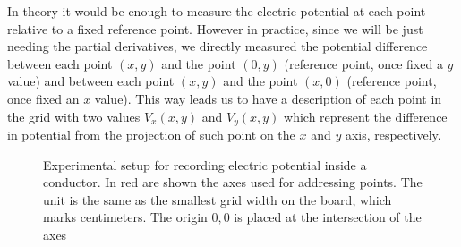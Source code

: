 \documentclass[notitlepage]{report}
\newcounter{theo}[section]\setcounter{theo}{0}
\numberwithin{equation}{section}
\theoremstyle{plain}
\theoremstyle{definition}
\theoremstyle{remark}
\begin{document}
In theory it would be enough to measure the electric potential at each point
relative to a fixed reference point. However in practice, since we will be just
needing the partial derivatives, we directly measured the potential difference
between each point \((x, y)\) and the point \((0, y)\) (reference point, once
fixed a \(y\) value) and between each point \((x, y)\) and the point \((x, 0)\)
(reference point, once fixed an \(x\) value). This way leads us to have a
description of each point in the grid with two values \(V_x(x, y)\) and \(V_y(x,
y)\) which represent the difference in potential from the projection of such
point on the \(x\) and \(y\) axis, respectively.

\begin{figure}[h!t]
    \caption{Experimental setup for recording electric potential inside a
    conductor. In red are shown the axes used for addressing points.
The unit is the same as the smallest grid width on the
board, which marks centimeters. The origin \(0,0\) is placed at the intersection
of the axes }\label{fig:setup-visualize}
\end{figure}
\end{document}
